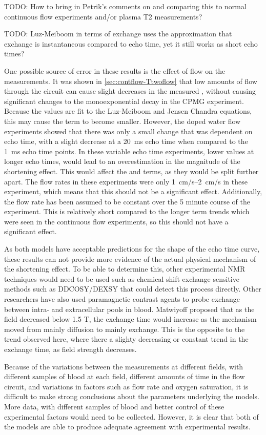 TODO: How to bring in Petrik's comments on \TtwoO and comparing this to normal continuous flow experiments and/or plasma T2 measurements?

TODO: Luz-Meiboom in terms of exchange uses the approximation that exchange is instantaneous compared to echo time, yet it still works as short echo times?

One possible source of error in these results is the effect of flow on the \Ttwo measurements.
It was shown in \autoref{sec:contflow-Ttwoflow} that low amounts of flow through the circuit can cause slight decreases in the measured \Ttwo, without causing significant changes to the monoexponential decay in the CPMG experiment.
Because the \Ttwo values are fit to the Luz-Meiboom and Jensen Chandra equations, this may cause the \TtwoO term to become smaller.
However, the doped water flow experiments showed that there was only a small change that was dependent on echo time, with a slight decrease at a \SI{20}{ms} echo time when compared to the \SI{1}{ms} echo time points.
In these variable echo time experiments, lower \Ttwo values at longer echo times, would lead to an overestimation in the magnitude of the \Ttwo shortening effect.
This would affect the \Kzero and \Gzero terms, as they would be split further apart.
The flow rates in these experiments were only \SIrange{1}{2}{cm/s} in these experiment, which means that this should not be a significant effect.
Additionally, the flow rate has been assumed to be constant over the 5 minute course of the experiment.
This is relatively short compared to the longer term trends which were seen in the continuous flow experiments, so this should not have a significant effect.

As both models have acceptable predictions for the shape of the echo time curve, these results can not provide more evidence of the actual physical mechanism of the \Ttwo shortening effect.
To be able to determine this, other experimental NMR techniques would need to be used such as chemical shift exchange sensitive methods such as DDCOSY/DEXSY that could detect this process directly.
Other researchers have also used paramagnetic contrast agents to probe exchange between intra- and extracellular pools in blood\cite{LiIntegratedanalysisdiffusion1998}.
Matwiyoff \cite{Matwiyofflineshapeswater1990} proposed that as the field decreased below 1.5 T, the exchange time would increase as the mechanism moved from mainly diffusion to mainly exchange.
This is the opposite to the trend observed here, where there a slighty decreasing or constant trend in the exchange time, as field strength decreases.

Because of the variations between the measurements at different fields, with different samples of blood at each field, different amounts of time in the flow circuit, and variations in factors such as flow rate and oxygen saturation, it is difficult to make strong conclusions about the parameters underlying the models.
More data, with different samples of blood and better control of these experimental factors would need to be collected.
However, it is clear that both of the models are able to produce adequate agreement with experimental results.
